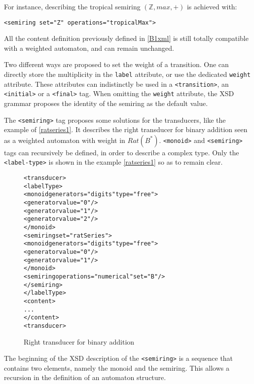 \documentclass[a4paper]{article}
\newcommand{\xtag}[1]{\texttt{<#1>}}
\def\typetag{\xtag{label-type}}
\def\transitiontag{\xtag{transition}}
\def\finaltag{\xtag{final}}
\def\initialtag{\xtag{initial}}
\def\monoidtag{\xtag{monoid}}
\def\semiringtag{\xtag{semiring}}
\begin{document}
For instance, describing the tropical semiring $({\mathbb Z}, max, +)$
is achieved with:
\begin{center}
{\small
\verb|<semiring set="Z" operations="tropicalMax">|}
\end{center}

All the content definition previously defined in \autoref{B1xml} is
still totally compatible with a weighted automaton, and can remain
unchanged.

Two different ways are proposed to set the weight of a transition. One
can directly store the multiplicity in the \verb|label| attribute, or
use the dedicated \verb|weight| attribute. These attributes can
indistinctly be used in a \transitiontag{}, an \initialtag{} or a
\finaltag{} tag. When omitting the \verb|weight| attribute, the XSD
grammar proposes the identity of the semiring as the default value.

\medskip

The \semiringtag{} tag proposes some solutions for the transducers,
like the example of \autoref{ratseries1}. It describes the right
transducer for binary addition seen as a weighted automaton with
weight in $Rat(B^*)$. \monoidtag{} and \semiringtag{} tags can
recursively be defined, in order to describe a complex type. Only the
\typetag{} is shown in the example \autoref{ratseries1} so as to
remain clear.

\begin{figure}[ht]
  \begin{center}
\begin{alltt}
<transducer>
  <labelType>
    <monoid generators="digits" type="free">
      <generator value="0"/>
      <generator value="1"/>
      <generator value="2"/>
    </monoid>
    <semiring set="ratSeries">
      <monoid generators="digits" type="free">
        <generator value="0"/>
        <generator value="1"/>
      </monoid>
      <semiring operations="numerical" set="B"/>
    </semiring>
  </labelType>
  <content>
    ...
  </content>
<transducer>
\end{alltt}

\caption{Right transducer for binary addition}
\label{ratseries1}
  \end{center}
\end{figure}

The beginning of the XSD description of the \semiringtag{} is a sequence that
contains two elements, namely the monoid and the semiring. This allows a
recursion in the definition of an automaton structure.
\end{document}
